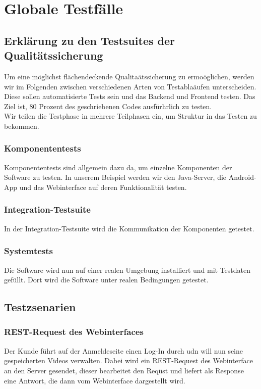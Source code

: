 \section{Globale Testf\"alle}
\subsection{Erkl\"arung zu den Testsuites der Qualit\"atssicherung}
Um eine m\"oglichst fl\"achendeckende Qualita\"atssicherung zu ermo\"oglichen, werden wir im Folgenden zwischen verschiedenen Arten von Testabla\"aufen unterscheiden. Diese sollen automatisierte Tests sein und das Backend und Frontend testen. Das Ziel ist, 80 Prozent des geschriebenen Codes ausf\"urhrlich zu testen. \\
Wir teilen die Testphase in mehrere Teilphasen ein, um Struktur in das Testen zu bekommen.
\subsubsection{Komponententests}
Komponententests sind allgemein dazu da, um einzelne Komponenten der Software zu testen. In unserem Beispiel werden wir den Java-Server, die Android-App und das Webinterface auf deren Funktionalit\"at testen. 
\subsubsection{Integration-Testsuite}
In der Integration-Testsuite wird die Kommunikation der Komponenten getestet.
\subsubsection{Systemtests}
Die Software wird nun auf einer realen Umgebung installiert und mit Testdaten gef\"ullt. Dort wird die Software unter realen Bedingungen getestet.

\subsection{Testzsenarien}
\subsubsection{REST-Request des Webinterfaces}
Der Kunde f\"uhrt auf der Anmeldeseite einen Log-In durch udn will nun seine gespeicherten Videos verwalten. Dabei wird ein REST-Request des Webinterface an den Server gesendet, dieser bearbeitet den Req\"ust und liefert als Response eine Antwort, die dann vom Webinterface dargestellt wird.

